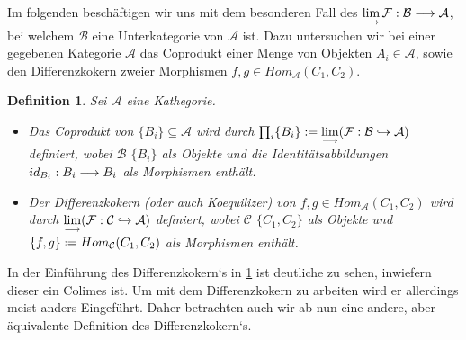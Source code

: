 \documentclass[10pt,a4paper]{report}
\newtheorem{definition}[satz]{Definition}
\newcommand{\functionfront}[3]{\nolinebreak{#1:#2 \longrightarrow #3}}
\newcommand{\colimes}[0]{\lim\limits_{ \longrightarrow }}
\newcommand{\infunctionfront}[3]{\nolinebreak{#1:#2 \hookrightarrow #3}}
\newcommand*{\defeq}{\mathrel{\vcenter{\baselineskip0.5ex \lineskiplimit0pt
                     \hbox{\scriptsize.}\hbox{\scriptsize.}}}%
                     =}
\begin{document}
Im folgenden beschäftigen wir uns mit dem besonderen Fall des $\colimes \functionfront{\mathcal{F}}{\mathcal{B}}{\mathcal{A}}$, bei welchem $\mathcal{B}$ eine Unterkategorie von $\mathcal{A}$ ist. Dazu untersuchen wir bei einer gegebenen Kategorie $\mathcal{A}$ das Coprodukt einer Menge von Objekten $A_i \in \mathcal{A}$, sowie den Differenzkokern zweier Morphismen $f,g \in Hom_{\mathcal{A}}(C_1,C_2)$.
\begin{definition} \label{altDifferenzkoerndef}
Sei $\mathcal{A}$ eine Kathegorie.
\begin{itemize}
\item Das Coprodukt von $ \lbrace B_i \rbrace \subseteq \mathcal{A}$ wird durch $\prod_i \lbrace B_i \rbrace := \colimes(\infunctionfront{\mathcal{F}}{\mathcal{B}}{\mathcal{A}})$ definiert, 
wobei $\mathcal{B}$ $\lbrace B_i \rbrace$ als Objekte und die Identitätsabbildungen $\functionfront{id_{B_i}}{B_i}{B_i}$ als Morphismen enthält.
\item Der Differenzkokern (oder auch Koequilizer) von $f,g \in Hom_{\mathcal{A}}(C_1,C_2)$ wird durch $\colimes(\infunctionfront{\mathcal{F}}{\mathcal{C}}{\mathcal{A}})$ definiert,
wobei $\mathcal{C}$ $\lbrace C_1,C_2 \rbrace$ als Objekte und $ \lbrace f,g \rbrace \defeq Hom_{\mathcal{C}}(C_1,C_2)$ als Morphismen enthält.
\end{itemize}
\end{definition}

In der Einführung des Differenzkokern`s in \cref{altDifferenzkoerndef} ist deutliche zu sehen, inwiefern dieser ein Colimes ist. Um mit dem Differenzkokern zu arbeiten wird er allerdings meist anders Eingeführt. Daher betrachten auch wir ab nun eine andere, aber äquivalente Definition des Differenzkokern`s.
\end{document}
